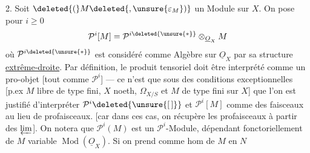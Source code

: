2. Soit $\deleted{(}M\deleted{,\unsure{\varepsilon_M})}$ un Module sur $X$.   On pose pour $i\geq0$
\[
\mathcal P^i[M]=\mathcal P^{i\deleted{\unsure{*}}}\otimes_{\underline O_X}M
\]
où $\mathcal P^{i\deleted{\unsure{*}}}$ est considéré comme Algèbre sur $\underline O_X$ par sa structure \uline{extrême-droite}.  Par définition, le produit tensoriel doit être interprété comme un pro-objet [tout comme $\mathcal P^i$] --- ce n'est que sous des conditions exceptionnelles [p.ex $M$ libre de type fini, $X$  noeth,  $\Omega_{X/S}$  et $M$ de type fini sur $X$] que l'on est justifié d'interpréter $\mathcal P^i\deleted{\unsure{[\,]}}$ et $\mathcal P^i[M]$ comme des faisceaux au lieu de profaisceaux. [car dans ces cas, on récupère les profaisceaux à partir des  $\varprojlim$]. On notera que $\mathcal P^i(M)$ est un $\mathcal P^i$-Module, dépendant fonctoriellement de $M$ variable  $\operatorname{Mod}(\underline O_X)$.
Si on prend comme hom de $M$ en $N$
